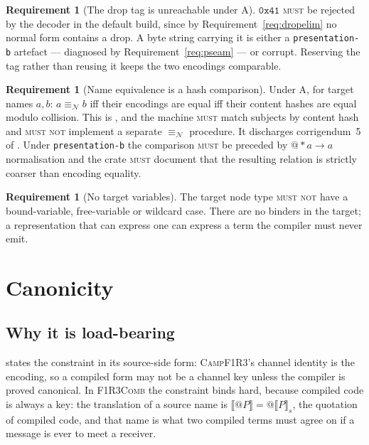 \documentclass[11pt,a4paper]{article}
\makeatletter
\newcommand{\code}[1]{\texttt{#1}}
\newcommand{\Comb}{\textsc{F1R3Comb}}
\newcommand{\Camp}{\textsc{CampF1R3}}
\newcommand{\MUST}{\textsc{must}}
\newcommand{\MUSTNOT}{\textsc{must not}}
\newcommand{\quo}[1]{@#1}
\newcommand{\drp}[1]{{*}#1}
\newcommand{\enc}[1]{\llbracket #1 \rrbracket}
\newcommand{\nequiv}{\equiv_{\mathcal{N}}}
\theoremstyle{definition}
\newtheorem{requirement}[definition]{Requirement}
\theoremstyle{plain}
\makeatother
\begin{document}
\begin{requirement}[The drop tag is unreachable under A]\label{req:droptag}
$\mathtt{0x41}$ \MUST{} be rejected by the decoder in the default build, since
by Requirement~\ref{req:dropelim} no normal form contains a drop. A byte
string carrying it is either a \code{presentation-b} artefact --- diagnosed by
Requirement~\ref{req:pseam} --- or corrupt. Reserving the tag rather than
reusing it keeps the two encodings comparable.
\end{requirement}

\begin{requirement}[Name equivalence is a hash comparison]\label{req:neq}
Under A, for target names $a,b$: $a \nequiv b$ iff their encodings are equal
iff their content hashes are equal modulo collision. This is
\cite[Prop.~2.10]{logic}, and the machine \MUST{} match subjects by content
hash and \MUSTNOT{} implement a separate $\nequiv$ procedure. It discharges
corrigendum~5 of \cite[\S11]{draft3}. Under \code{presentation-b} the
comparison \MUST{} be preceded by $\quo{\drp{a}} \to a$ normalisation and the
crate \MUST{} document that the resulting relation is strictly coarser than
encoding equality.
\end{requirement}

\begin{requirement}[No target variables]\label{req:novars}
The target node type \MUSTNOT{} have a bound-variable, free-variable or
wildcard case. There are no binders in the target; a representation that can
express one can express a term the compiler must never emit.
\end{requirement}

\section{Canonicity}\label{sec:canon}

\subsection{Why it is load-bearing}

\cite[\S\,identity]{bytecode} states the constraint in its source-side form:
\Camp's channel identity is the encoding, so a compiled form may not be a
channel key unless the compiler is proved canonical. In \Comb{} the
constraint binds hard, because compiled code is always a key: the translation
of a source name is $\enc{\quo{P}} = \quo{\enc{P}_{s}}$, the quotation of
compiled code, and that name is what two compiled terms must agree on if a
message is ever to meet a receiver.
\end{document}
